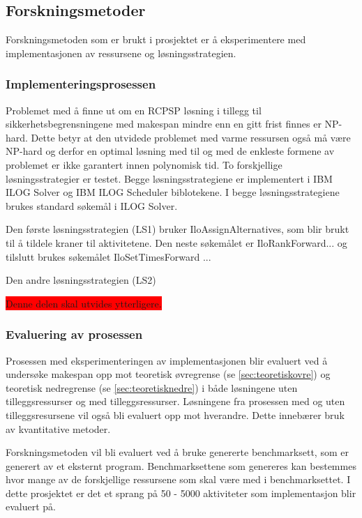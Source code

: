 \subsection{Forskningsmetoder}
Forskningsmetoden som er brukt i prosjektet er å eksperimentere med implementasjonen av ressursene og løsningsstrategien.

\subsubsection{Implementeringsprosessen}
Problemet med å finne ut om en RCPSP løsning i tillegg til sikkerhetsbegrensningene med makespan mindre enn en gitt frist finnes er NP-hard. Dette betyr at den utvidede problemet med varme ressursen også må være NP-hard og derfor en optimal løsning med til og med de enkleste formene av problemet er ikke garantert innen polynomisk tid. To forskjellige løsningsstrategier er testet. Begge løsningsstrategiene er implementert i IBM ILOG Solver og IBM ILOG Scheduler biblotekene. I begge løsningsstrategiene brukes standard søkemål i ILOG Solver.

Den første løsningsstrategien (LS1) bruker IloAssignAlternatives, som blir brukt til å tildele kraner til aktivitetene. Den neste søkemålet er IloRankForward... og tilslutt brukes søkemålet IloSetTimesForward ...

Den andre løsningsstrategien (LS2)

\colorbox{red}{Denne delen skal utvides ytterligere.}

\subsubsection{Evaluering av prosessen}
Prosessen med eksperimenteringen av implementasjonen blir evaluert ved å undersøke makespan opp mot teoretisk øvregrense (se \ref{sec:teoretiskovre}) og teoretisk nedregrense (se \ref{sec:teoretisknedre}) i både løsningene uten tilleggsressurser og med tilleggsressurser. Løsningene fra prosessen med og uten tilleggsresursene vil også bli evaluert opp mot hverandre. Dette innebærer bruk av kvantitative metoder.

Forskningsmetoden vil bli evaluert ved å bruke genererte benchmarksett, som er generert av et eksternt program. Benchmarksettene som genereres kan bestemmes hvor mange av de forskjellige ressursene som skal være med i benchmarksettet. I dette prosjektet er det et sprang på 50 - 5000 aktiviteter som implementasjon blir evaluert på.

